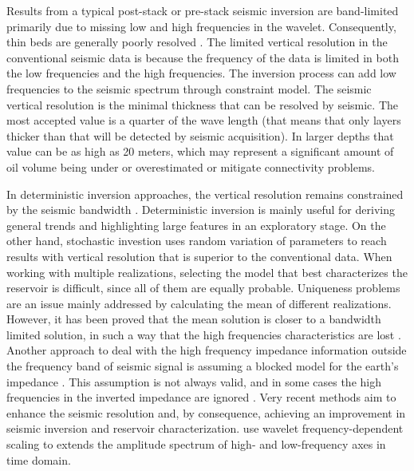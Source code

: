 \documentclass[journal]{IEEEtran}
\begin{document}
Results from a typical post-stack or pre-stack seismic
inversion are band-limited primarily due to missing low
and high frequencies in the wavelet. Consequently, thin beds
are generally poorly resolved \cite{Zhang2012}. The limited
vertical resolution in the conventional seismic data is because 
the frequency of the data is limited in both the low frequencies
and the high frequencies. The inversion process can add low
frequencies to the seismic spectrum through constraint model.
The seismic vertical resolution is the minimal thickness that
can be resolved by seismic. The most accepted value is a quarter
of the wave length (that means that only layers thicker than
that will be detected by seismic acquisition). In larger depths
that value can be as high as 20 meters, which may represent a
significant amount of oil volume being under or overestimated or
mitigate connectivity problems.

In deterministic inversion approaches, the vertical resolution
remains constrained by the seismic bandwidth \cite{Sancevero2005}.
Deterministic inversion is mainly useful for deriving general
trends and highlighting large features in an exploratory stage.
On the other hand, stochastic investion uses random variation
of parameters to reach results with vertical resolution that is
superior to the conventional data. When working with multiple
realizations, selecting the model that best characterizes the
reservoir is difficult, since all of them are equally probable.
Uniqueness problems are an issue mainly addressed by calculating
the mean of different realizations. However, it has been proved
that the mean solution is closer to a bandwidth limited solution,
in such a way that the high frequencies characteristics are lost
\cite{Cook2010}. Another approach to deal with the high frequency
impedance information outside the frequency band of seismic signal
is assuming a blocked model for the earth's impedance \cite{Cook2010}.
This assumption is not always valid, and in some cases the high
frequencies in the inverted impedance are ignored \cite{YuanWang2015}.
Very recent methods aim to enhance the seismic resolution and, by
consequence, achieving an improvement in seismic inversion and
reservoir characterization. \cite{ChenWang2018} use wavelet
frequency-dependent scaling to extends the amplitude spectrum of
high- and low-frequency axes in time domain.
\end{document}
